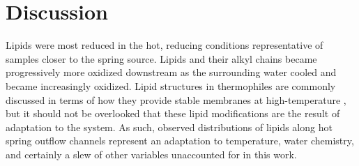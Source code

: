 

\section{Discussion}

Lipids were most reduced in the hot, reducing conditions representative of samples closer to the spring source. Lipids and their alkyl chains became progressively more oxidized downstream as the surrounding water cooled and became increasingly oxidized. Lipid structures in thermophiles are commonly discussed in terms of how they provide stable membranes at high-temperature \citep{daniel2000biomolecular}, but it should not be overlooked that these lipid modifications are the result of adaptation to the system. As such, observed distributions of lipids along hot spring outflow channels represent an adaptation to temperature, water chemistry, and certainly a slew of other variables unaccounted for in this work.

